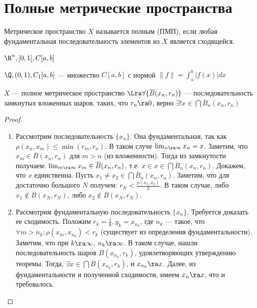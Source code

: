 
\section{Полные метрические пространства}

\begin{definition}
    Метрическое пространство \(X\) называется полным (ПМП), если любая фундаментальная последовательность элементов из \(X\) является сходящейся.
\end{definition}

\begin{example}[Полные МП]
    \(\R^n, [0, 1], C[a, b]\)
\end{example}

\begin{example}[Неполные МП]
    \(\Q, (0, 1), C_1[a, b]\) --- множество \(C[a, b]\) с нормой \(\|f\| = \int_a^b |f(x)|dx\)
\end{example}

\begin{theorem}
    \(X\) --- полное метрическое пространство \(\Lra \forall \{\overline{B}(x_n, r_n)\}\) --- последовательность замкнутых вложенных шаров, таких, что \(r_n \ra 0\), верно \(\exists ! x \in \bigcap \overline{B}_n(x_n, r_n)\)
\end{theorem}
\begin{proof}
    \begin{enumerate}
        \item[\(\Ra\)] Рассмотрим последовательность \(\{x_n\}\). Она фундаментальная, так как \(\rho(x_n, x_m) \le \min(r_m, r_n)\). В таком случе \(\lim_{n \ra \infty} x_n = x\). Заметим, что \(x_m \in \overline{B}(x_n, r_n)\) для \(m > n\) (из вложенности). Тогда из замкнутости получаем: \(\lim_{m \ra \infty} x_m \in \overline{B}(x_n, r_n)\), т.е. \(x \in x \in \bigcap \overline{B}_n(x_n, r_n)\). Докажем, что \(x\) единственна. Пусть \(x_1 \ne x_2 \in \bigcap \overline{B}_n(x_n, r_n)\). Заметим, что для достаточно большого \(N\) получем: \(r_N < \frac{\rho(x_1, x_2)}{2}\). В таком случае, либо \(x_1 \notin \overline{B}(x_N, r_N)\), либо \(x_2 \notin \overline{B}(x_N, r_N)\).
        \item[\(\La\)] Рассмотрим фундаментальную последовательность \(\{x_n\}\). Требуется доказать ее сходимость. Положим \(r_k = \frac{1}{k}, y_k = x_{n_k}\), где \(n_k\) --- такое, что \(\forall m > n_k: \rho(x_m, x_{n_k}) < r_k\) (существует из определения фундаментальности). Заметим, что при \(k \ra \infty\), \(n_k \ra \infty\). В таком случае, нашли последовательность шаров \(\overline{B}(x_{n_k}, r_k)\), удовлетворяющих утверждению теоремы. Тогда, \(\exists x \in \bigcap \overline{B}(x_{n_k}, r_k)\), и \(x_{n_k} \ra x\). Далее, из фундаментальности и полученной сходимости, имеем \(x_n \ra x\), что и требовалось.
    \end{enumerate}
\end{proof}

